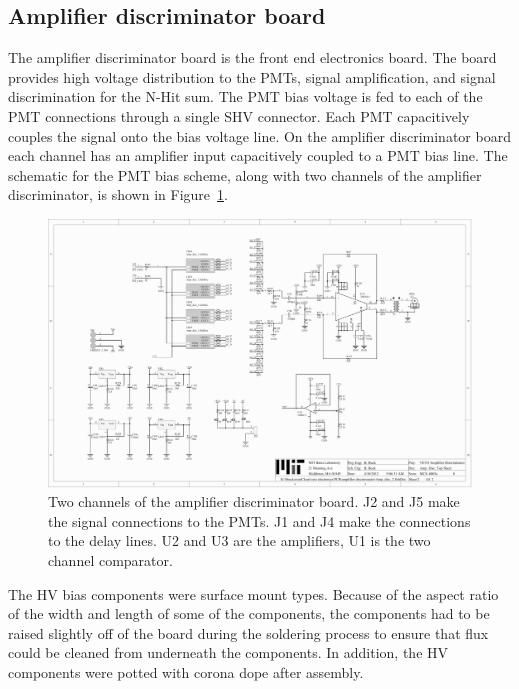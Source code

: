 \documentclass[pdftex]{JINST}
\begin{document}
\subsection{Amplifier discriminator board}
\label{sec:Amp-Disc}
%
The amplifier discriminator board is the front end electronics board.
The board provides high voltage distribution to the PMTs, signal
amplification, and signal discrimination for the N-Hit sum. The PMT
bias voltage is fed to each of the PMT connections through a single
SHV connector. Each PMT capacitively couples the signal onto the bias
voltage line. On the amplifier discriminator board each channel has
an amplifier input capacitively coupled to a PMT bias line. The schematic for the
PMT bias scheme, along with two channels of the amplifier discriminator, is shown in Figure~\ref{fig:ampdiscsch}.

\begin{figure}[ht]
\begin{center}
\includegraphics[width=5.5in, keepaspectratio=true, page=2, trim=4.54in 2.12in 4.54in 2.12in, clip=true]{graphics/veto_sch.pdf}
\caption{Two channels of the amplifier discriminator board. J2 and J5 make the signal connections to the PMTs. J1 and J4 make the connections to the delay lines. U2 and U3 are the amplifiers, U1 is the two channel comparator.
\label{fig:ampdiscsch}}
\end{center}
\end{figure}

The HV bias components were surface mount types. Because of the
aspect ratio of the width and length of some of the components, the
components had to be raised slightly off of the board during the
soldering process to ensure that flux could be cleaned from underneath
the components. In addition, the HV components were potted with
corona dope after assembly.
\end{document}
